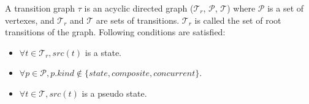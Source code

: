 \begin{definition} A transition graph $\tau$ is an acyclic directed graph ($\mathcal{T}_r$, $\mathcal{P}$, $\mathcal{T}$) where $\mathcal{P}$ is a set of vertexes, and $\mathcal{T}_{r}$ and $\mathcal{T}$ are sets of transitions. $\mathcal{T}_{r}$ is called the set of root transitions of the graph. Following conditions are satisfied:
	\begin{itemize}
		\item $\forall t \in \mathcal{T}_r, src(t)$ is a state.
		
		\item $\forall p \in \mathcal{P}, p.kind \notin \{state, composite, concurrent\}$.	
		
		\item $\forall t \in \mathcal{T}, src(t)$ is a pseudo state.
	\end{itemize}	
\end{definition}


